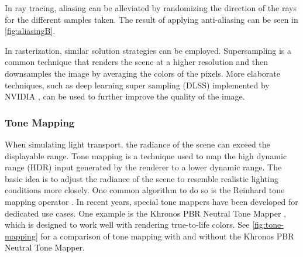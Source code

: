 In ray tracing, aliasing can be alleviated by randomizing the direction of the rays for the different samples taken. The result of applying anti-aliasing can be seen in \autoref{fig:aliasingB}.

In rasterization, similar solution strategies can be employed. Supersampling is a common technique that renders the scene at a higher resolution and then downsamples the image by averaging the colors of the pixels. More elaborate techniques, such as deep learning super sampling (DLSS) implemented by NVIDIA \cite{nvidiaDlss}, can be used to further improve the quality of the image.

\subsubsection{Tone Mapping}
\label{sec:toneMappingTheory}

When simulating light transport, the radiance of the scene can exceed the displayable range. Tone mapping is a technique used to map the high dynamic range (\gls{HDR}) input generated by the renderer to a lower dynamic range. The basic idea is to adjust the radiance of the scene to resemble realistic lighting conditions more closely. One common algorithm to do so is the Reinhard tone mapping operator \cite{reinhardToneMapping}. In recent years, special tone mappers have been developed for dedicated use cases. One example is the Khronos \gls{PBR} Neutral Tone Mapper \cite{pbrNeutralToneMapping}, which is designed to work well with rendering true-to-life colors. See \autoref{fig:tone-mapping} for a comparison of tone mapping with and without the Khronos \gls{PBR} Neutral Tone Mapper.


